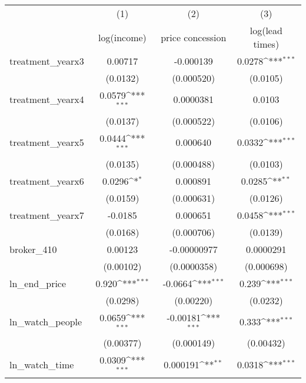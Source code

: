 {
\def\sym#1{\ifmmode^{#1}\else\(^{#1}\)\fi}
\begin{tabular}{l*{3}{c}}
\toprule
            &\multicolumn{1}{c}{(1)}&\multicolumn{1}{c}{(2)}&\multicolumn{1}{c}{(3)}\\
            &\multicolumn{1}{c}{log(income)}&\multicolumn{1}{c}{price concession}&\multicolumn{1}{c}{log(lead times)}\\
\midrule
treatment\_yearx3&     0.00717         &   -0.000139         &      0.0278\sym{***}\\
            &    (0.0132)         &  (0.000520)         &    (0.0105)         \\
\addlinespace
treatment\_yearx4&      0.0579\sym{***}&   0.0000381         &      0.0103         \\
            &    (0.0137)         &  (0.000522)         &    (0.0106)         \\
\addlinespace
treatment\_yearx5&      0.0444\sym{***}&    0.000640         &      0.0332\sym{***}\\
            &    (0.0135)         &  (0.000488)         &    (0.0103)         \\
\addlinespace
treatment\_yearx6&      0.0296\sym{*}  &    0.000891         &      0.0285\sym{**} \\
            &    (0.0159)         &  (0.000631)         &    (0.0126)         \\
\addlinespace
treatment\_yearx7&     -0.0185         &    0.000651         &      0.0458\sym{***}\\
            &    (0.0168)         &  (0.000706)         &    (0.0139)         \\
\addlinespace
broker\_410  &     0.00123         & -0.00000977         &   0.0000291         \\
            &   (0.00102)         & (0.0000358)         &  (0.000698)         \\
\addlinespace
ln\_end\_price&       0.920\sym{***}&     -0.0664\sym{***}&       0.239\sym{***}\\
            &    (0.0298)         &   (0.00220)         &    (0.0232)         \\
\addlinespace
ln\_watch\_people&      0.0659\sym{***}&    -0.00181\sym{***}&       0.333\sym{***}\\
            &   (0.00377)         &  (0.000149)         &   (0.00432)         \\
\addlinespace
ln\_watch\_time&      0.0309\sym{***}&    0.000191\sym{**} &      0.0318\sym{***}\\

\end{tabular}}
